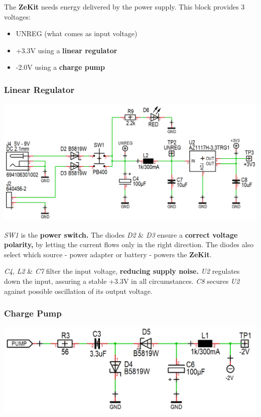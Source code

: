 \documentclass{scrartcl}
\begin{document}
The \textbf{ZeKit} needs energy delivered by the power supply. This block provides 3 voltages:
\begin{itemize}
    \item UNREG (what comes as input voltage)
    \item +3.3V using a \textbf{linear regulator}
    \item -2.0V using a \textbf{charge pump}
\end{itemize}

\subsubsection{Linear Regulator}

\vspace{-0.25cm}
\begin{center}
    \includegraphics[scale=0.42]{assets/schema-power.png}
\end{center}

\emph{SW1} is the \textbf{power switch.} The diodes \emph{D2} \& \emph{D3} ensure a \textbf{correct voltage polarity,} by letting the current flows only in the right direction. The diodes also select which source - power adapter or battery - powers the \textbf{ZeKit}.

\emph{C4}, \emph{L2} \& \emph{C7} filter the input voltage, \textbf{reducing supply noise.} \emph{U2} regulates down the input, assuring a stable +3.3V in all circumstances. \emph{C8} secures \emph{U2} against possible oscillation of its output voltage.

\subsubsection{Charge Pump}

\begin{center}
    \includegraphics[scale=0.3]{assets/schema-pump.png}
\end{center}
\end{document}

